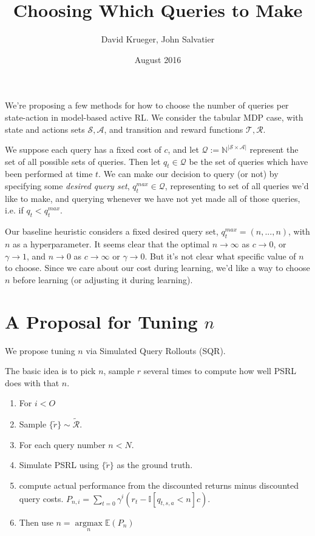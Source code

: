 \documentclass{article}
\title{Choosing Which Queries to Make}
\author{David Krueger, John Salvatier}
\date{August 2016}
\begin{document}
\maketitle




We're proposing a few methods for how to choose the number of queries per state-action in model-based active RL.
We consider the tabular MDP case, with state and actions sets $\mathcal{S}, \mathcal{A}$, and transition and reward functions $\mathcal{T}, \mathcal{R}$.

We suppose each query has a fixed cost of $c$, and let $\mathcal{Q} := \mathbb{N}^{| \mathcal{S} \times \mathcal{A} |}$ represent the set of all possible sets of queries.
Then let $q_t \in \mathcal{Q}$ be the set of queries which have been performed at time $t$.
We can make our decision to query (or not) by specifying some \emph{desired query set}, $q^{max}_t \in \mathcal{Q}$, representing to set of all queries we'd like to make, and querying whenever we have not yet made all of those queries, i.e. if $q_t < q^{max}_t$.

Our baseline heuristic considers a fixed desired query set, $q^{max}_t = (n,...,n)$, with $n$ as a hyperparameter.
It seems clear that the optimal $n \rightarrow \infty$ as $c \rightarrow 0$, or $\gamma \rightarrow 1$, and $n \rightarrow 0$ as $c \rightarrow \infty$ or $\gamma \rightarrow 0$.
But it's not clear what specific value of $n$ to choose.
Since we care about our cost during learning, we'd like a way to choose $n$ before learning (or adjusting it during learning).

\section{A Proposal for Tuning $n$}
We propose tuning $n$ via Simulated Query Rollouts (SQR). 

The basic idea is to pick $n$, sample $r$ several times to compute how well PSRL does with that $n$. 
  
\begin{enumerate}
    \item For $i < O$
    \item Sample $\{\tilde{r}\} \sim \tilde{\mathcal{R}}$.
    \item For each query number $n < N $.
    \item Simulate PSRL using $\{\tilde{r}\}$ as the ground truth.
    \item compute actual performance from the discounted returns minus discounted query costs. $ P_{n,i} = \sum_{t=0} \gamma^i (r_t - \mathbb{I}[q_{t,s,a} < n]c)  $.
    \item Then use $n = \mathop{\mathrm{argmax}}\limits_n \mathbb{E}({P_n}) $
\end{enumerate}
\end{document}
